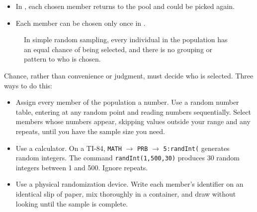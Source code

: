 \begin{itemize}
    \item In , each chosen member returns to the pool and could be picked again.
    \item Each member can be chosen only once in .
\end{itemize}


\begin{figure}[H]
\centering
{}
\caption{In simple random sampling, every individual in the population has an equal chance of being selected, and there is no grouping or pattern to who is chosen.}
\label{fig:srs-sampling}
\end{figure}

Chance, rather than convenience or judgment, must decide who is selected. Three ways to do this:

\begin{itemize}
    \item Assign every member of the population a number. Use a random number table, entering at any random point and reading 
    numbers sequentially. Select members whose numbers appear, skipping values outside your range and any repeats, until you have 
    the sample size you need.
    \item Use a calculator. On a TI-84, \texttt{MATH} $\to$ \texttt{PRB} $\to$ \texttt{5:randInt(} generates random integers. 
    The command \texttt{randInt(1,500,30)} produces 30 random integers between 1 and 500. Ignore repeats.
    \item Use a physical randomization device. Write each member's identifier on an identical slip of paper, mix thoroughly in a 
    container, and draw without looking until the sample is complete.
\end{itemize}

